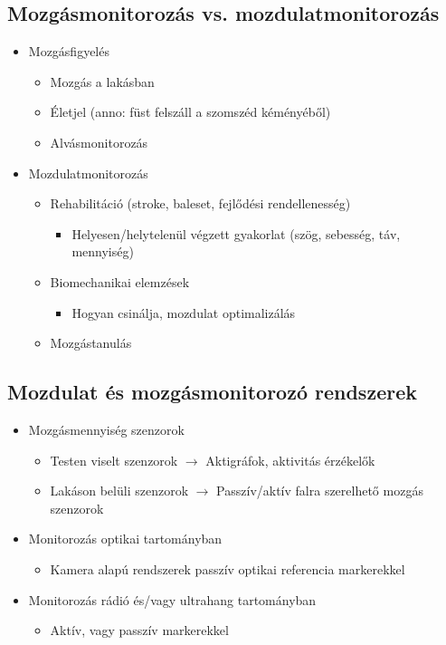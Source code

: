\subsection{Mozgásmonitorozás vs. mozdulatmonitorozás}
\begin{itemize}
    \item Mozgásfigyelés
    \begin{itemize}
        \item Mozgás a lakásban
        \item Életjel (anno: füst felszáll a szomszéd kéményéből)
        \item Alvásmonitorozás
    \end{itemize}
    \item Mozdulatmonitorozás
    \begin{itemize}
        \item Rehabilitáció (stroke, baleset, fejlődési rendellenesség)
        \begin{itemize}
            \item Helyesen/helytelenül végzett gyakorlat (szög, sebesség, táv, mennyiség)
        \end{itemize}
        \item Biomechanikai elemzések
        \begin{itemize}
            \item Hogyan csinálja, mozdulat optimalizálás
        \end{itemize}
        \item Mozgástanulás
    \end{itemize}
\end{itemize}

\subsection{Mozdulat és mozgásmonitorozó rendszerek}
\begin{itemize}
    \item Mozgásmennyiség szenzorok
    \begin{itemize}
        \item Testen viselt szenzorok $\rightarrow$ Aktigráfok, aktivitás érzékelők
        \item Lakáson belüli szenzorok $\rightarrow$ Passzív/aktív falra szerelhető mozgás szenzorok
    \end{itemize}
    \item Monitorozás optikai tartományban
    \begin{itemize}
        \item Kamera alapú rendszerek passzív optikai referencia markerekkel
    \end{itemize}
    \item Monitorozás rádió és/vagy ultrahang tartományban
    \begin{itemize}
        \item Aktív, vagy passzív markerekkel
    \end{itemize}
\end{itemize}

